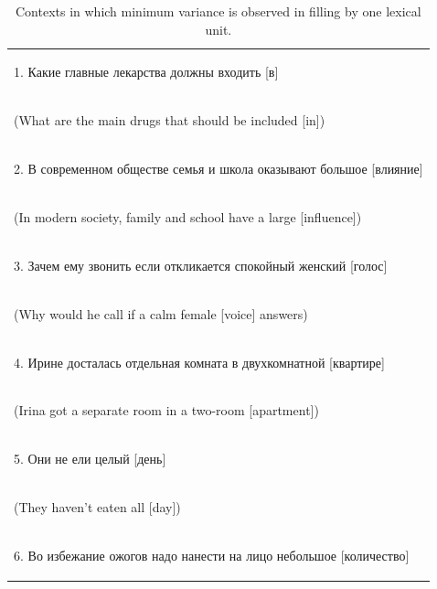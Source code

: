 \documentclass[a4paper]{article}
\begin{document}
\begin{table}
\label{tbl:min-var}
\caption{Contexts in which minimum variance is observed in filling by one lexical unit.}
\centering

\vspace{0.5em}

\begin{tabular}{l}
\begin{russian} 1. Какие главные лекарства должны входить [в]\end{russian} \\
\begin{english} (What are the main drugs that should be included [in])\end{english} \\
\begin{russian} 2. В современном обществе семья и школа оказывают большое [влияние]\end{russian} \\
\begin{english} (In modern society, family and school have a large [influence])\end{english} \\
\begin{russian} 3. Зачем ему звонить если откликается спокойный женский [голос]\end{russian} \\
\begin{english} (Why would he call if a calm female [voice] answers)\end{english} \\
\begin{russian} 4. Ирине досталась отдельная комната в двухкомнатной [квартире]\end{russian} \\
\begin{english} (Irina got a separate room in a two-room [apartment])\end{english} \\
\begin{russian} 5. Они не ели целый [день]\end{russian} \\
\begin{english} (They haven't eaten all [day])\end{english} \\
\begin{russian} 6. Во избежание ожогов надо нанести на лицо небольшое [количество]\end{russian} \\

\end{tabular}
\end{table}
\end{document}
